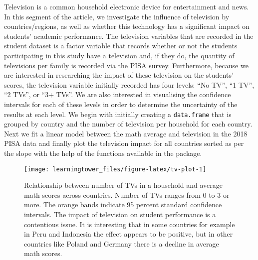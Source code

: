 Television is a common household electronic device for entertainment and news. In this segment of the article, we investigate the influence of television by countries/regions, as well as whether this technology has a significant impact on students' academic performance. The television variables that are recorded in the student dataset is a factor variable that records whether or not the students participating in this study have a television and, if they do, the quantity of televisions per family is recorded via the PISA survey. Furthermore, because we are interested in researching the impact of these television on the students' scores, the television variable initially recorded has four levels: ``No TV'', ``1 TV'', ``2 TVs'', or ``3+ TVs''. We are also interested in visualising the confidence intervals for each of these levels in order to determine the uncertainty of the results at each level. We begin with initially creating a \texttt{data.frame} that is grouped by country and the number of television per household for each country. Next we fit a linear model between the math average and television in the 2018 PISA data and finally plot the television impact for all countries sorted as per the slope with the help of the functions available in the  \citep{ggplot2} package.

\begin{figure}[H]
\texttt{[image: learningtower\_files/figure-latex/tv-plot-1]} \caption{Relationship  between number of TVs in a household and average math scores across countries. Number of TVs ranges from 0 to 3 or more. The orange bands indicate 95 percent standard confidence intervals. The impact of television on student performance is a contentious issue. It is interesting that in some countries for example in Peru and Indonesia the effect appears to be positive, but in other countries like Poland and Germany there is a decline in average math scores.}\label{fig:tv-plot}
\end{figure}

